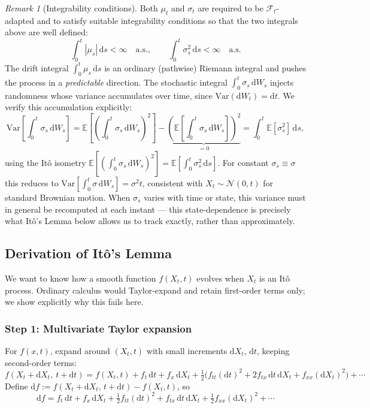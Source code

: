 \documentclass[11pt]{article}
\theoremstyle{definition}
\theoremstyle{remark}
\newtheorem{remark}[theorem]{Remark}
\newcommand{\dd}{\mathrm{d}}
\newcommand{\E}{\mathbb{E}}
\newcommand{\F}{\mathcal{F}}
\newcommand{\N}{\mathcal{N}}
\newcommand{\Var}{\mathrm{Var}}
\begin{document}
\begin{remark}[Integrability conditions]
Both $\mu_t$ and $\sigma_t$ are required to be $\F_t$-adapted and to satisfy suitable
integrability conditions so that the two integrals above are well defined:
\[
\int_0^t |\mu_s|\,\dd s < \infty \quad \text{a.s.}, \qquad \int_0^t \sigma_s^2 \,\dd s < \infty \quad \text{a.s.}
\]
The drift integral $\int_0^t \mu_s\,\dd s$ is an ordinary (pathwise) Riemann integral and pushes the
process in a \emph{predictable} direction. The stochastic integral $\int_0^t \sigma_s\,\dd W_s$
injects randomness whose variance accumulates over time, since $\Var(\dd W_t) = \dd t$. We verify
this accumulation explicitly:
\[
\Var\!\left[\int_0^t \sigma_s \,\dd W_s\right]
= \E\!\left[\left(\int_0^t \sigma_s\,\dd W_s\right)^2\right] - \underbrace{\left(\E\!\left[\int_0^t \sigma_s\,\dd W_s\right]\right)^2}_{=0}
= \int_0^t \E[\sigma_s^2]\,\dd s,
\]
using the Itô isometry $\E\!\left[\left(\int_0^t \sigma_s\,\dd W_s\right)^2\right] = \E\!\left[\int_0^t \sigma_s^2\,\dd s\right]$.
For constant $\sigma_s \equiv \sigma$ this reduces to $\Var\!\left[\int_0^t \sigma\,\dd W_s\right] = \sigma^2 t$,
consistent with $X_t \sim \N(0,t)$ for standard Brownian motion. When $\sigma_s$ varies with time or
state, this variance must in general be recomputed at each instant — this state-dependence is
precisely what Itô's Lemma below allows us to track exactly, rather than approximately.
\end{remark}

\subsection{Derivation of Itô's Lemma}

We want to know how a smooth function $f(X_t,t)$ evolves when $X_t$ is an Itô process. Ordinary
calculus would Taylor-expand and retain first-order terms only; we show explicitly why this fails
here.

\subsubsection*{Step 1: Multivariate Taylor expansion}

For $f(x,t)$, expand around $(X_t,t)$ with small increments $\dd X_t$, $\dd t$, keeping second-order
terms:
\[
f(X_t+\dd X_t,\ t+\dd t) = f(X_t,t) + f_t\,\dd t + f_x\,\dd X_t
+ \tfrac12\Big(f_{tt}(\dd t)^2 + 2f_{tx}\,\dd t\,\dd X_t + f_{xx}(\dd X_t)^2\Big) + \cdots
\]
Define $\dd f := f(X_t+\dd X_t,\,t+\dd t) - f(X_t,t)$, so
\[
\dd f = f_t\,\dd t + f_x\,\dd X_t + \tfrac12 f_{tt}(\dd t)^2 + f_{tx}\,\dd t\,\dd X_t
+ \tfrac12 f_{xx}(\dd X_t)^2 + \cdots
\]
\end{document}
